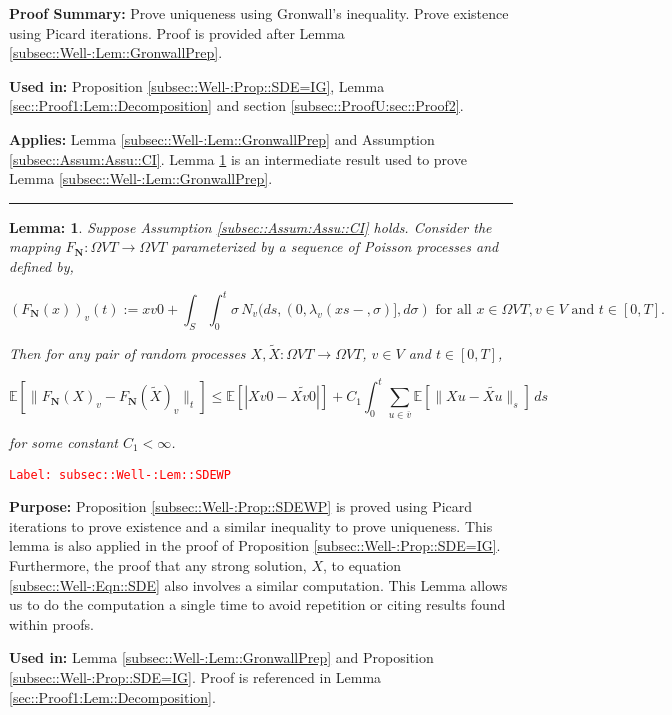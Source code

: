 \documentclass[12pt]{article}
\newcommand{\mb}{\mathbb}
\newcommand{\ra}{\rightarrow}
\newcommand{\ov}{\overline}
\newcommand{\te}{\text}
\newcommand{\tr}{\textcolor{red}}
\newcommand{\labe}[1]{\tr{\texttt{Label: #1}}}
\newcommand{\purpose}{\textbf{Purpose: }}
\newcommand{\pfsum}{\textbf{Proof Summary: }}
\newcommand{\usein}{\textbf{Used in: }}
\newcommand{\app}{\textbf{Applies: }}
\newcommand{\lin}{\rule{\linewidth}{0.4 pt}}
\newcommand{\ex}[1]{\mb{E}\left[#1\right]}			%
\renewcommand{\v}{v}							%
\newcommand{\vv}{u}								%
\renewcommand{\S}{S}							%
\newcommand{\s}{\sigma}							%
\newcommand{\T}{T}								%
\newcommand{\x}{x}								%
\renewcommand{\t}{t}							%
\renewcommand{\tt}{s}							%
\newcommand{\X}{X}								%
\newcommand{\cl}{\ov}							%
\newcommand{\poiss}[1]{N_{#1}}						%
\newcommand{\poisses}{\mathbf{N}}				%
\newcommand{\V}{V}									%
\newcommand{\rate}[1]{\lambda_{#1}}					%
\newcommand{\const}[1]{C_{#1}}						%
\newcommand{\alt}{\widetilde}						%
\newtheorem{lem}[thms]{Lemma: }
\begin{document}
\pfsum Prove uniqueness using Gronwall's inequality. Prove existence using Picard iterations. Proof is provided after Lemma \ref{subsec::Well-:Lem::GronwallPrep}.

\usein Proposition \ref{subsec::Well-:Prop::SDE=IG}, Lemma \ref{sec::Proof1:Lem::Decomposition} and section \ref{subsec::ProofU:sec::Proof2}.

\app Lemma \ref{subsec::Well-:Lem::GronwallPrep} and Assumption \ref{subsec::Assum:Assu::CI}. Lemma \ref{subsec::Well-:Lem::SDEWP} is an intermediate result used to prove Lemma \ref{subsec::Well-:Lem::GronwallPrep}.

\lin

\begin{lem}
Suppose Assumption \ref{subsec::Assum:Assu::CI} holds. Consider the mapping \(F_\poisses: \Omega{\V}{\T} \ra \Omega{\V}{\T}\) parameterized by a sequence of Poisson processes and defined by,

\[\left(F_\poisses(\x{}{})\right)_\v(\t) := \x{\v}{0} + \int_\S\int_0^\t \s \,\poiss{\v}(d\tt,(0,\rate{\v}(\x{}{\tt-},\s)],d\s) \te{ for all }\x{}{} \in \Omega{\V}{\T}, \v \in \V\te{ and }\t \in [0,\T].\]

Then for any pair of random processes \(\X{}{},\alt{\X{}{}}:\Omega{\V}{\T} \ra \Omega{\V}{\T}\), \(\v\in \V\) and \(\t \in [0,\T]\),

\[\ex{\|F_\poisses(\X{}{})_\v - F_\poisses(\alt{\X{}{}})_\v\|_\t} \leq \ex{|\X{\v}{0} - \alt{\X{\v}{0}}|} +  \const{1}\int_0^\t \sum_{\vv\in \cl{\v}} \ex{\|\X{\vv}{} - \alt{\X{\vv}{}}\|_\tt}\,d\tt\]

for some constant \(\const{1} < \infty\).

\label{subsec::Well-:Lem::SDEWP}
\end{lem}
\labe{subsec::Well-:Lem::SDEWP}

\purpose Proposition \ref{subsec::Well-:Prop::SDEWP} is proved using Picard iterations to prove existence and a similar inequality to prove uniqueness. This lemma is also applied in the proof of Proposition \ref{subsec::Well-:Prop::SDE=IG}. Furthermore, the proof that any strong solution, \(\X{}{}\), to equation \eqref{subsec::Well-:Eqn::SDE} also involves a similar computation. This Lemma allows us to do the computation a single time to avoid repetition or citing results found within proofs.

\usein Lemma \ref{subsec::Well-:Lem::GronwallPrep} and Proposition \ref{subsec::Well-:Prop::SDE=IG}. Proof is referenced in Lemma \ref{sec::Proof1:Lem::Decomposition}.
\end{document}
